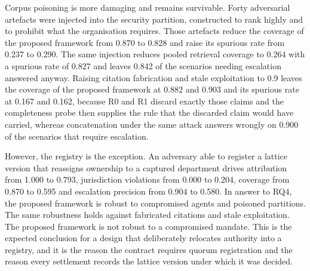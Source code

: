 \documentclass[journal]{IEEEtran}
\begin{document}
Corpus poisoning is more damaging and remains survivable. Forty adversarial artefacts were injected into the security partition, constructed to rank highly and to prohibit what the organisation requires. Those artefacts reduce the coverage of the proposed framework from 0.870 to 0.828 and raise its spurious rate from 0.237 to 0.290. The same injection reduces pooled retrieval coverage to 0.264 with a spurious rate of 0.827 and leaves 0.842 of the scenarios needing escalation answered anyway. Raising citation fabrication and stale exploitation to 0.9 leaves the coverage of the proposed framework at 0.882 and 0.903 and its spurious rate at 0.167 and 0.162, because R0 and R1 discard exactly those claims and the completeness probe then supplies the rule that the discarded claim would have carried, whereas concatenation under the same attack answers wrongly on 0.900 of the scenarios that require escalation.

However, the registry is the exception. An adversary able to register a lattice version that reassigns ownership to a captured department drives attribution from 1.000 to 0.793, jurisdiction violations from 0.000 to 0.204, coverage from 0.870 to 0.595 and escalation precision from 0.904 to 0.580. In answer to RQ4, the proposed framework is robust to compromised agents and poisoned partitions. The same robustness holds against fabricated citations and stale exploitation. The proposed framework is not robust to a compromised mandate. This is the expected conclusion for a design that deliberately relocates authority into a registry, and it is the reason the contract requires quorum registration and the reason every settlement records the lattice version under which it was decided.
\end{document}
